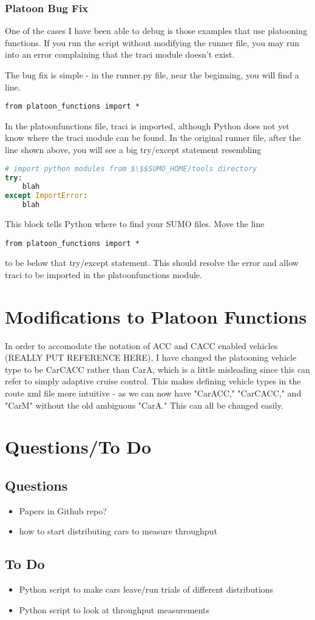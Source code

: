 \documentclass{article}
\begin{document}
\subsubsection{Platoon Bug Fix}
One of the cases I have been able to debug is those examples that use platooning functions. If you run the script without modifying the runner file, you may run into an error complaining that the traci module doesn't exist. 

The bug fix is simple - in the runner.py file, near the beginning, you will find a line. 
\begin{lstlisting}
from platoon_functions import *
\end{lstlisting}
In the platoon\textunderscore functions file, traci is imported, although Python does not yet know where the traci module can be found. In the original runner file, after the line shown above, you will see a big try/except statement resembling
\begin{lstlisting}[language=Python]
# import python modules from $\$$SUMO_HOME/tools directory
try:
    blah
except ImportError:
    blah
\end{lstlisting}
This block tells Python where to find your SUMO files. Move the line
\begin{lstlisting}
from platoon_functions import *
\end{lstlisting}
to be below that try/except statement. This should resolve the error and allow traci to be imported in the platoon\textunderscore functions module. 

\section{Modifications to Platoon Functions}
In order to accomodate the notation of ACC and CACC enabled vehicles (REALLY PUT REFERENCE HERE), I have changed the platooning vehicle type to be CarCACC rather than CarA, which is a little misleading since this can refer to simply adaptive cruise control. This makes defining vehicle types in the route xml file more intuitive - as we can now have "CarACC," "CarCACC," and "CarM" without the old ambiguous "CarA." This can all be changed easily.  


\section{Questions/To Do}
\subsection{Questions}
\begin{itemize}
	\item Papers in Github repo? 
	\item how to start distributing cars to measure throughput
\end{itemize}

\subsection{To Do}
\begin{itemize}
	\item Python script to make cars leave/run trials of different distributions
	\item Python script to look at throughput measurements
\end{itemize}




\end{document}
